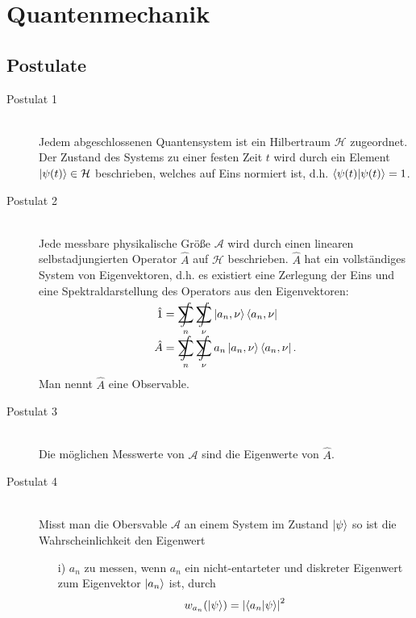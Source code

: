 \section{Quantenmechanik}
	\subsection{Postulate}
		\begin{description} %
			\item[Postulat 1]\hfill \\
				Jedem abgeschlossenen Quantensystem ist ein Hilbertraum $\mathcal{H}$ zugeordnet. Der Zustand des Systems zu einer festen Zeit $t$ wird durch ein Element $\Ket{\psi(t)} \in \mathcal{H}$ beschrieben, welches auf Eins normiert ist, d.h. $\braket{\psi(t)|\psi(t)} = 1$.
			\item[Postulat 2]\hfill \\
				Jede messbare physikalische Größe $\mathcal{A}$ wird durch einen linearen selbstadjungierten Operator $\hat{A}$ auf $\mathcal{H}$ beschrieben. $\hat{A}$ hat ein vollständiges System von Eigenvektoren, d.h. es existiert eine Zerlegung der Eins und eine Spektraldarstellung des Operators aus den Eigenvektoren:
				\begin{equation}
					\begin{aligned}
						\hat{1} &= \SumInt_n \SumInt_\nu \Ket{a_n,\nu}\Bra{a_n,\nu} \\
						\hat{A} &= \SumInt_n \SumInt_\nu a_n\Ket{a_n,\nu}\Bra{a_n,\nu}. \\
					\end{aligned}
				\end{equation}
				Man nennt $\hat{A}$ eine Observable.
			\item[Postulat 3]\hfill \\
				Die möglichen Messwerte von $\mathcal{A}$ sind die Eigenwerte von $\hat{A}$.
			\item[Postulat 4]\hfill \\
				Misst man die Obersvable $\mathcal{A}$ an einem System im Zustand $\Ket{\psi}$ so ist die Wahrscheinlichkeit den Eigenwert
				\begin{itemize}
					\item[i)] $a_n$ zu messen, wenn $a_n$ ein nicht-entarteter und diskreter Eigenwert zum Eigenvektor $\Ket{a_n}$ ist, durch
					\begin{equation}
						w_{a_n}(\Ket{\psi}) = \left| \braket{a_n|\psi} \right|^2
					\end{equation}

\end{itemize}
\end{description}
